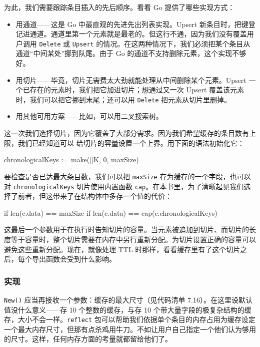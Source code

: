 为此，我们需要跟踪条目插入的先后顺序。看看 Go 提供了哪些实现方式：

\begin{itemize}
  \item 用通道——这是 Go 中最直观的先进先出列表实现。Upsert 新条目时，把键登记进通道。通道里第一个元素就是最老的。但这行不通，因为我们没有覆盖用户调用 \texttt{Delete} 或 \texttt{Upsert} 的情况。在这两种情况下，我们必须把某个条目从通道``中间某处''挪到队尾。由于 Go 的通道不支持删除元素，这个实现不够好。
  \item 用切片——毕竟，切片无需费太大劲就能处理从中间删除某个元素。Upsert 一个已存在的元素时，我们把它加进切片；想通过又一次 Upsert 覆盖该元素时，我们可以把它挪到末尾；还可以用 \texttt{Delete} 把元素从切片里删掉。
  \item 用其他可用方案——比如，可以用二叉搜索树。
\end{itemize}

这一次我们选择切片，因为它覆盖了大部分需求。因为我们希望缓存的条目数有上限，我们已经知道可以
给切片的容量设置一个上界。用下面的语法初始化它：

\begin{gocode}[]
chronologicalKeys := make([]K, 0, maxSize)
\end{gocode}

要检查是否已达最大条目数，我们可以把 \texttt{maxSize} 存为缓存的一个字段，也可以对 \texttt{chronologicalKeys} 切片使用内置函数 \texttt{cap}。在本书里，为了清晰起见我们选择了前者，但这带来了在结构体中多存一个值的代价：

\begin{gocode}[]
if len(c.data) == maxSize
if len(c.data) == cap(c.chronologicalKeys)
\end{gocode}

这最后一个参数用于在执行时告知切片的容量。当元素被追加到切片、而切片的长度等于容量时，整个切片需要在内存中另行重新分配。为切片设置正确的容量可以避免这些重新分配。现在，就像处理 TTL 时那样，看看缓存里有了这个切片之后，每个导出函数会受到什么影响。

\subsubsection*{实现}

\texttt{New()} 应当再接收一个参数：缓存的最大尺寸（见代码清单 7.16）。在这里设默认值没什么意义——存 10 个整数的缓存，与存 10 个带大量字段的极复杂结构的缓存，大小不会一样。\texttt{reflect} 包可以帮助我们依据单个条目的内存占用为缓存设定一个最大内存尺寸，但那有点杀鸡用牛刀。不如让用户自己指定一个他们认为够用的尺寸。这样，任何内存方面的考量就都留给他们了。


